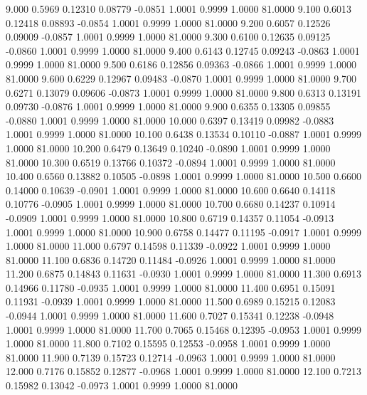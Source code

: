    9.000   0.5969   0.12310   0.08779  -0.0851   1.0001   0.9999   1.0000  81.0000
   9.100   0.6013   0.12418   0.08893  -0.0854   1.0001   0.9999   1.0000  81.0000
   9.200   0.6057   0.12526   0.09009  -0.0857   1.0001   0.9999   1.0000  81.0000
   9.300   0.6100   0.12635   0.09125  -0.0860   1.0001   0.9999   1.0000  81.0000
   9.400   0.6143   0.12745   0.09243  -0.0863   1.0001   0.9999   1.0000  81.0000
   9.500   0.6186   0.12856   0.09363  -0.0866   1.0001   0.9999   1.0000  81.0000
   9.600   0.6229   0.12967   0.09483  -0.0870   1.0001   0.9999   1.0000  81.0000
   9.700   0.6271   0.13079   0.09606  -0.0873   1.0001   0.9999   1.0000  81.0000
   9.800   0.6313   0.13191   0.09730  -0.0876   1.0001   0.9999   1.0000  81.0000
   9.900   0.6355   0.13305   0.09855  -0.0880   1.0001   0.9999   1.0000  81.0000
  10.000   0.6397   0.13419   0.09982  -0.0883   1.0001   0.9999   1.0000  81.0000
  10.100   0.6438   0.13534   0.10110  -0.0887   1.0001   0.9999   1.0000  81.0000
  10.200   0.6479   0.13649   0.10240  -0.0890   1.0001   0.9999   1.0000  81.0000
  10.300   0.6519   0.13766   0.10372  -0.0894   1.0001   0.9999   1.0000  81.0000
  10.400   0.6560   0.13882   0.10505  -0.0898   1.0001   0.9999   1.0000  81.0000
  10.500   0.6600   0.14000   0.10639  -0.0901   1.0001   0.9999   1.0000  81.0000
  10.600   0.6640   0.14118   0.10776  -0.0905   1.0001   0.9999   1.0000  81.0000
  10.700   0.6680   0.14237   0.10914  -0.0909   1.0001   0.9999   1.0000  81.0000
  10.800   0.6719   0.14357   0.11054  -0.0913   1.0001   0.9999   1.0000  81.0000
  10.900   0.6758   0.14477   0.11195  -0.0917   1.0001   0.9999   1.0000  81.0000
  11.000   0.6797   0.14598   0.11339  -0.0922   1.0001   0.9999   1.0000  81.0000
  11.100   0.6836   0.14720   0.11484  -0.0926   1.0001   0.9999   1.0000  81.0000
  11.200   0.6875   0.14843   0.11631  -0.0930   1.0001   0.9999   1.0000  81.0000
  11.300   0.6913   0.14966   0.11780  -0.0935   1.0001   0.9999   1.0000  81.0000
  11.400   0.6951   0.15091   0.11931  -0.0939   1.0001   0.9999   1.0000  81.0000
  11.500   0.6989   0.15215   0.12083  -0.0944   1.0001   0.9999   1.0000  81.0000
  11.600   0.7027   0.15341   0.12238  -0.0948   1.0001   0.9999   1.0000  81.0000
  11.700   0.7065   0.15468   0.12395  -0.0953   1.0001   0.9999   1.0000  81.0000
  11.800   0.7102   0.15595   0.12553  -0.0958   1.0001   0.9999   1.0000  81.0000
  11.900   0.7139   0.15723   0.12714  -0.0963   1.0001   0.9999   1.0000  81.0000
  12.000   0.7176   0.15852   0.12877  -0.0968   1.0001   0.9999   1.0000  81.0000
  12.100   0.7213   0.15982   0.13042  -0.0973   1.0001   0.9999   1.0000  81.0000
